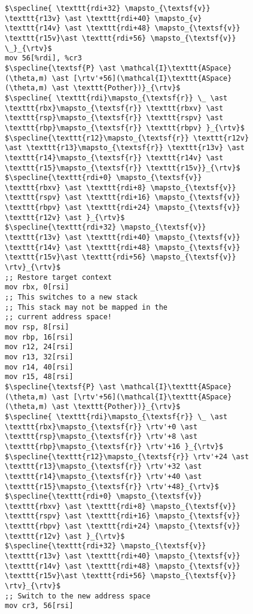 \begin{figure}
\begin{lstlisting}[mathescape]
$\specline{ \texttt{rdi+32} \mapsto_{\textsf{v}} \texttt{r13v} \ast \texttt{rdi+40} \mapsto_{v} \texttt{r14v} \ast \texttt{rdi+48} \mapsto_{\textsf{v}} \texttt{r15v}\ast \texttt{rdi+56} \mapsto_{\textsf{v}} \_}_{\rtv}$
mov 56[%rdi], %cr3
$\specline{\textsf{P} \ast \mathcal{I}\texttt{ASpace}(\theta,m) \ast [\rtv'+56](\mathcal{I}\texttt{ASpace}(\theta,m) \ast \texttt{Pother})}_{\rtv}$
$\specline{ \texttt{rdi}\mapsto_{\textsf{r}} \_ \ast \texttt{rbx}\mapsto_{\textsf{r}} \texttt{rbxv} \ast  \texttt{rsp}\mapsto_{\textsf{r}} \texttt{rspv} \ast \texttt{rbp}\mapsto_{\textsf{r}} \texttt{rbpv} }_{\rtv}$
$\specline{\texttt{r12}\mapsto_{\textsf{r}} \texttt{r12v} \ast \texttt{r13}\mapsto_{\textsf{r}} \texttt{r13v} \ast \texttt{r14}\mapsto_{\textsf{r}} \texttt{r14v} \ast \texttt{r15}\mapsto_{\textsf{r}} \texttt{r15v}}_{\rtv}$
$\specline{\texttt{rdi+0} \mapsto_{\textsf{v}} \texttt{rbxv} \ast \texttt{rdi+8} \mapsto_{\textsf{v}} \texttt{rspv} \ast \texttt{rdi+16} \mapsto_{\textsf{v}} \texttt{rbpv} \ast \texttt{rdi+24} \mapsto_{\textsf{v}} \texttt{r12v} \ast }_{\rtv}$
$\specline{\texttt{rdi+32} \mapsto_{\textsf{v}} \texttt{r13v} \ast \texttt{rdi+40} \mapsto_{\textsf{v}} \texttt{r14v} \ast \texttt{rdi+48} \mapsto_{\textsf{v}} \texttt{r15v}\ast \texttt{rdi+56} \mapsto_{\textsf{v}} \rtv}_{\rtv}$    
;; Restore target context
mov rbx, 0[rsi] 
;; This switches to a new stack
;; This stack may not be mapped in the
;; current address space!
mov rsp, 8[rsi] 
mov rbp, 16[rsi]
mov r12, 24[rsi]
mov r13, 32[rsi]
mov r14, 40[rsi]
mov r15, 48[rsi]
$\specline{\textsf{P} \ast \mathcal{I}\texttt{ASpace}(\theta,m) \ast [\rtv'+56](\mathcal{I}\texttt{ASpace}(\theta,m) \ast \texttt{Pother})}_{\rtv}$
$\specline{ \texttt{rdi}\mapsto_{\textsf{r}} \_ \ast \texttt{rbx}\mapsto_{\textsf{r}} \rtv'+0 \ast  \texttt{rsp}\mapsto_{\textsf{r}} \rtv'+8 \ast \texttt{rbp}\mapsto_{\textsf{r}} \rtv'+16 }_{\rtv}$
$\specline{\texttt{r12}\mapsto_{\textsf{r}} \rtv'+24 \ast \texttt{r13}\mapsto_{\textsf{r}} \rtv'+32 \ast \texttt{r14}\mapsto_{\textsf{r}} \rtv'+40 \ast \texttt{r15}\mapsto_{\textsf{r}} \rtv'+48}_{\rtv}$
$\specline{\texttt{rdi+0} \mapsto_{\textsf{v}} \texttt{rbxv} \ast \texttt{rdi+8} \mapsto_{\textsf{v}} \texttt{rspv} \ast \texttt{rdi+16} \mapsto_{\textsf{v}} \texttt{rbpv} \ast \texttt{rdi+24} \mapsto_{\textsf{v}} \texttt{r12v} \ast }_{\rtv}$
$\specline{\texttt{rdi+32} \mapsto_{\textsf{v}} \texttt{r13v} \ast \texttt{rdi+40} \mapsto_{\textsf{v}} \texttt{r14v} \ast \texttt{rdi+48} \mapsto_{\textsf{v}} \texttt{r15v}\ast \texttt{rdi+56} \mapsto_{\textsf{v}} \rtv}_{\rtv}$
;; Switch to the new address space
mov cr3, 56[rsi]

\end{lstlisting}
\end{figure}
